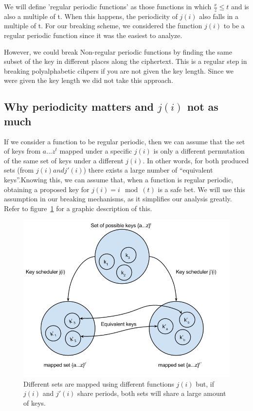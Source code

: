 \documentclass[pdftex,12pt,letter]{article}
\begin{document}
We will define 'regular periodic functions' as those functions in which
$\frac{x}{z} \leq t$ and is also a multiple of t. When this happens, the
periodicity of $j(i)$ also falls in a multiple of t. For our breaking scheme,
we considered the function $j(i)$ to  be a regular periodic function since it
was the easiest to analyze. 

However, we could break Non-regular periodic functions by finding the same
subset of the key in different places along the ciphertext. This is a regular
step in breaking polyalphabetic cihpers if you are not given the key length.
Since we were given the key length we did not take this approach.   

\subsection{Why periodicity matters and $j(i)$ not as much}

If we consider a function to be regular periodic, then we can assume that the
set of keys from ${a...z}^t$ mapped under a specific $j(i)$ is only a different
permutation of the same set of keys under a different $j(i)$. In other words,
for both produced sets (from $j(i) and j'(i)$) there exists a large number of
``equivalent keys''.Knowing this, we can assume that, when a function is
regular periodic, obtaining a proposed key for $j(i) = i \mod(t)$ is a safe
bet. We will use this assumption in our breaking mechanisms, as it simplifies
our analysis greatly. Refer to figure~\ref{key-sets} for a graphic description
of this.

\begin{figure}[ht!]
    \centering
    \includegraphics[width=.8\textwidth]{key-mapping}
    \caption{Different sets are mapped using different functions $j(i)$ but,
    if $j(i)$ and $j'(i)$ share periods, both sets will share a large amount of keys.}
    \label{key-sets}
\end{figure}
\end{document}
